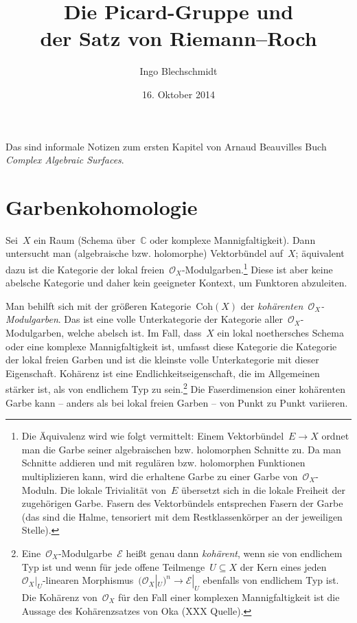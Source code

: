\documentclass[a4paper,ngerman,12pt]{scrartcl}
\theoremstyle{definition}
\theoremstyle{plain}
\theoremstyle{remark}
\newcommand{\CC}{\mathbb{C}}
\newcommand{\E}{\mathcal{E}}
\renewcommand{\O}{\mathcal{O}}
\newcommand{\Coh}{\mathrm{Coh}}
\begin{document}
\title{Die Picard-Gruppe und \\ der Satz von Riemann--Roch}
\author{Ingo Blechschmidt}
\date{16. Oktober 2014}
\maketitle

\begin{center}\begin{minipage}{0.8\textwidth}
Das sind informale Notizen zum ersten Kapitel von Arnaud Beauvilles Buch
\emph{Complex Algebraic Surfaces}.
\end{minipage}\end{center}
\vspace{1em}

\tableofcontents


\section{Garbenkohomologie}

Sei~$X$ ein Raum (Schema über~$\CC$ oder komplexe Mannigfaltigkeit). Dann
untersucht man (algebraische bzw. holomorphe) Vektorbündel auf~$X$; äquivalent
dazu ist die Kategorie der lokal freien~$\O_X$-Modulgarben.\footnote{Die
Äquivalenz wird wie folgt vermittelt: Einem Vektorbündel~$E \to X$ ordnet man
die Garbe seiner algebraischen bzw. holomorphen Schnitte zu. Da man Schnitte
addieren und mit regulären bzw. holomorphen Funktionen multiplizieren kann,
wird die erhaltene Garbe zu einer Garbe von~$\O_X$-Moduln. Die lokale
Trivialität von~$E$ übersetzt sich in die lokale Freiheit der zugehörigen
Garbe. Fasern des Vektorbündels entsprechen Fasern der Garbe (das sind die
Halme, tensoriert mit dem Restklassenkörper an der jeweiligen Stelle).}
Diese ist aber keine abelsche Kategorie und daher kein geeigneter Kontext, um
Funktoren abzuleiten.

Man behilft sich mit der größeren Kategorie~$\Coh(X)$ der
\emph{kohärenten~$\O_X$-Modulgarben}. Das ist eine volle Unterkategorie der
Kategorie aller~$\O_X$-Modulgarben, welche abelsch ist. Im Fall, dass~$X$ ein
lokal noethersches Schema oder eine komplexe Mannigfaltigkeit ist, umfasst
diese Kategorie die Kategorie der lokal freien Garben und ist die kleinste
volle Unterkategorie mit dieser Eigenschaft. Kohärenz ist eine
Endlichkeitseigenschaft, die im Allgemeinen stärker ist, als von endlichem Typ
zu sein.\footnote{Eine~$\O_X$-Modulgarbe~$\E$ heißt genau dann \emph{kohärent},
wenn sie von endlichem Typ ist und wenn für jede offene Teilmenge~$U \subseteq
X$ der Kern eines jeden~$\O_X|_U$-linearen Morphismus~$(\O_X|_U)^n \to \E|_U$
ebenfalls von endlichem Typ ist. Die Kohärenz von~$\O_X$ für den Fall einer
komplexen Mannigfaltigkeit ist die Aussage des Kohärenzsatzes von Oka (XXX Quelle).} Die
Faserdimension einer kohärenten Garbe kann -- anders als bei lokal freien
Garben -- von Punkt zu Punkt variieren.
\end{document}
